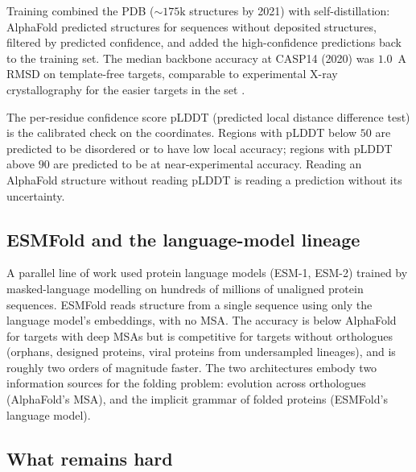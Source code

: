 

Training combined the PDB ($\sim 175\text{k}$ structures by 2021) with
self-distillation: AlphaFold predicted structures for sequences without
deposited structures, filtered by predicted confidence, and added the
high-confidence predictions back to the training set. The
median backbone accuracy at CASP14 (2020) was $1.0$~A RMSD on
template-free targets, comparable to experimental X-ray crystallography
for the easier targets in the set
\cite[][\ p.~586]{paper:v6c11-jumper-alphafold-2021}.

The per-residue confidence score pLDDT (predicted local distance
difference test) is the calibrated check on the coordinates. Regions
with pLDDT below $50$ are predicted to be disordered or to have low
local accuracy; regions with pLDDT above $90$ are predicted to be at
near-experimental accuracy. Reading an AlphaFold structure without
reading pLDDT is reading a prediction without its uncertainty.

\subsection{ESMFold and the language-model lineage}

A parallel line of work used protein language models (ESM-1, ESM-2)
\cite{paper:v6c11-lin-esm2-2023} trained by masked-language modelling on
hundreds of millions of unaligned protein sequences. ESMFold reads
structure from a single sequence using only the language model's
embeddings, with no MSA. The accuracy is below AlphaFold for targets
with deep MSAs but is competitive for targets without orthologues
(orphans, designed proteins, viral proteins from undersampled lineages),
and is roughly two orders of magnitude faster. The two architectures
embody two information sources for the folding problem: evolution
across orthologues (AlphaFold's MSA), and the implicit grammar of
folded proteins (ESMFold's language model).

\subsection{What remains hard}

